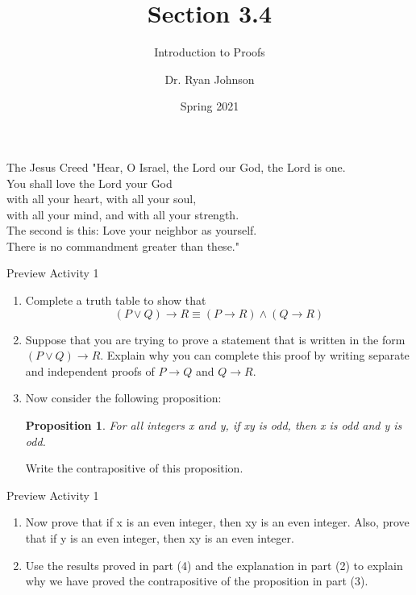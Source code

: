 \documentclass{beamer}
\title{Section 3.4}
\subtitle{Introduction to Proofs}
\author{Dr. Ryan Johnson}
\institute{Grace College}
\date{Spring 2021}
\newcounter{saveenumi}
\newcommand{\seti}{\setcounter{saveenumi}{\value{enumi}}}
\newcommand{\conti}{\setcounter{enumi}{\value{saveenumi}}}
\newtheorem{prop}[theorem]{Proposition}
\begin{document}
\begin{frame}[plain]
    \maketitle
\end{frame}

\begin{frame}{The Jesus Creed}
\Large{
"Hear, O Israel, the Lord our God, the Lord is one.\\
You shall love the Lord your God\\
\;\; with all your heart, with all your soul,\\
\;\; with all your mind, and with all your strength.\\
The second is this: Love your neighbor as yourself.\\
There is no commandment greater than these."
}
\end{frame}

\begin{frame}{Preview Activity 1}
    \begin{enumerate}
        \item Complete a truth table to show that
        \[
        (P \vee Q) \to R \equiv (P \to R) \wedge (Q \to R)
        \] \pause
        \item Suppose that you are trying to prove a statement that is written in the form $(P \vee Q) \to R$. Explain why you can complete this proof by writing separate and independent proofs of $P \to Q$ and $Q \to R$. \pause
        \item Now consider the following proposition:
        \begin{prop}
            For all integers x and y, if xy is odd, then x is odd and y is odd.
        \end{prop}
        Write the contrapositive of this proposition.
        \seti
    \end{enumerate}
\end{frame}

\begin{frame}{Preview Activity 1}
    \begin{enumerate}
        \conti
        \item Now prove that if x is an even integer, then xy is an even integer. Also, prove that if y is an even integer, then xy is an even integer. \pause
        \item Use the results proved in part (4) and the explanation in part (2) to explain why we have proved the contrapositive of the proposition in part (3).
    \end{enumerate}
\end{frame}
\end{document}
